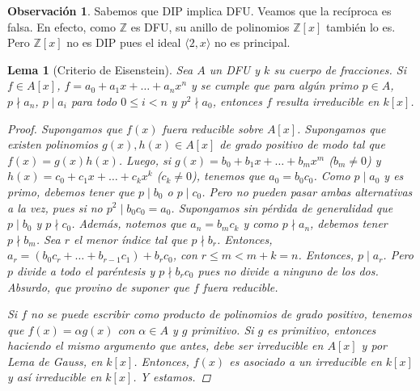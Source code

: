 \documentclass[12pt]{book}
\newtheorem{lem}[teo]{Lema}
\theoremstyle{definition}
\newtheorem{obs}[teo]{Observación}
\newcommand{\ZZ}{\mathbb{Z}}      %
\begin{document}
\begin{obs}
Sabemos que DIP implica DFU. Veamos que la recíproca es falsa. En efecto, como $\ZZ$ es DFU, su anillo de polinomios $\ZZ[x]$ también lo es. Pero $\ZZ[x]$ no es DIP pues el ideal $\langle 2,x\rangle$ no es principal.
\end{obs}

\begin{lem}[Criterio de Eisenstein]
Sea $A$ un DFU y $k$ su cuerpo de fracciones. Si $f\in A[x]$, $f=a_0 + a_1x + \ldots + a_n x^n$ y se cumple que para algún primo $p\in A$, $p\nmid a_n$, $p\mid a_i$ para todo $0\leq i <n$ y $p^2\nmid a_0$, entonces $f$ resulta irreducible en $k[x]$.
\begin{proof}

Supongamos que $f(x)$ fuera reducible sobre $A[x]$. Supongamos que existen polinomios $g(x),h(x)\in A[x]$ de grado positivo de modo tal que $f(x)=g(x)h(x)$. Luego, si $g(x) = b_0 + b_1 x + \ldots + b_m x^m$ ($b_m\neq 0$) y $h(x)=c_0 + c_1x+\ldots + c_k x^k$ ($c_k\neq 0$), tenemos que $a_0 = b_0 c_0$. Como $p\mid a_0$ y es primo, debemos tener que $p\mid b_0$ o $p\mid c_0$. Pero no pueden pasar ambas alternativas a la vez, pues si no $p^2 \mid b_0c_0=a_0$. Supongamos sin pérdida de generalidad que $p\mid b_0$ y $p\nmid c_0$. Además, notemos que $a_n = b_m c_k$ y como $p\nmid a_n$, debemos tener $p\nmid b_m$. Sea $r$ el menor índice tal que $p\nmid b_r$. Entonces, $a_r = (b_0c_r + \ldots + b_{r-1}c_1) + b_rc_0$, con $r\leq m < m+k=n$. Entonces, $p\mid a_r$. Pero $p$ divide a todo el paréntesis y $p\nmid b_r c_0$ pues no divide a ninguno de los dos. Absurdo, que provino de suponer que $f$ fuera reducible.

Si $f$ no se puede escribir como producto de polinomios de grado positivo, tenemos que $f(x) = \alpha g(x)$ con $\alpha\in A$ y $g$ primitivo. Si $g$ es primitivo, entonces haciendo el mismo argumento que antes, debe ser irreducible en $A[x]$ y por Lema de Gauss, en $k[x]$. Entonces, $f(x)$ es asociado a un irreducible en $k[x]$ y así irreducible en $k[x]$. Y estamos.

\end{proof}
\end{lem}
\end{document}
